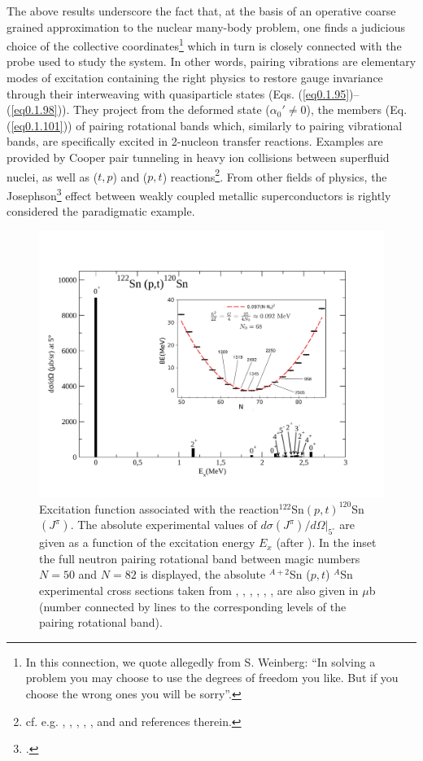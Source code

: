 The above results underscore the fact that, at the basis of an operative coarse grained approximation to the nuclear many-body problem, one finds a judicious choice of the collective coordinates\footnote{In this connection, we quote allegedly from S. Weinberg: ``In solving a problem you may choose to use the degrees of freedom you like. But if you choose the wrong ones you will be sorry''.} which in turn is closely connected with the probe used to study the system. In other words, pairing vibrations are elementary modes of excitation containing the right physics to restore gauge invariance through their interweaving with  quasiparticle states (Eqs. (\ref{eq0.1.95})--(\ref{eq0.1.98})). They project from the deformed state ($\alpha_0'\neq0$), the members (Eq. (\ref{eq0.1.101})) of pairing rotational bands which, similarly to pairing vibrational bands, are specifically excited in 2-nucleon transfer reactions. Examples are provided by Cooper pair tunneling in heavy ion collisions between superfluid nuclei, as well as ($t,p$) and ($p,t$) reactions\footnote{cf. e.g. \cite{Yoshida:62}, \cite{Broglia:73}, \cite{Bayman:71}, \cite{Glendenning:65}, \cite{Bohr:64}, \cite{Hansen:12} and \cite{Potel:13} and references therein.}. From other fields of physics, the Josephson\footnote{\cite{Josephson:62}.} effect between weakly coupled metallic superconductors is rightly considered the paradigmatic example.  
  \begin{figure}
  \centerline{\includegraphics*[width=\textwidth,angle=0]{nutshell/figs/ExcitedSn122pt.pdf}}
  \caption{Excitation function associated with the reaction$^{122}$Sn$(p,t)^{120}$Sn$(J^\pi)$. The absolute experimental values of $d\sigma(J^\pi)/d\Omega|_{5^\circ}$ are given as a function of the excitation energy $E_x$ (after \cite{Guazzoni:11}). In the inset the full neutron pairing rotational band between magic numbers $N=50$ and $N=82$ is  displayed, the absolute $^{A+2}$Sn ($p,t$) $^{A}$Sn experimental cross sections taken from \cite{Guazzoni:99}, \cite{Guazzoni:04}, \cite{Guazzoni:06}, \cite{Guazzoni:08}, \cite{Guazzoni:11}, \cite{Guazzoni:12}, are also given in $\mu$b (number connected by lines to the corresponding levels of the pairing rotational band).}\label{fig1.3}
  \end{figure}

